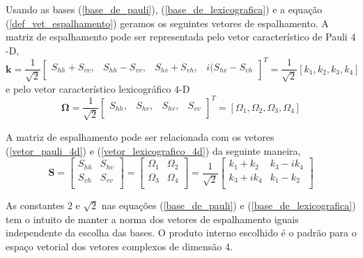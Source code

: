 Usando as bases (\ref{base_de_pauli}), (\ref{base_de_lexicografica}) e a equação (\ref{def_vet_espalhamento}) geramos os seguintes vetores de espalhamento. A matriz de espalhamento pode ser representada pelo vetor característico de Pauli $4$-D,
\begin{equation}\label{vetor_pauli_4d}
\mathbf{k}= \frac{1}{\sqrt{2}}\left[
	\begin{array}{cccc}
	S_{hh} + S_{vv},& S_{hh} - S_{vv},& S_{hv} + S_{vh}, &i (S_{hv} - S_{vh}   \\
\end{array}\right]^T=\frac{1}{\sqrt{2}}[k_1, k_2, k_3, k_4]
\end{equation}
e pelo vetor característico lexicográfico $4$-D 
\begin{equation}\label{vetor_lexicografico_4d}
\mathbf{\Omega}= \frac{1}{\sqrt{2}}\left[
	\begin{array}{cccc}
	S_{hh},& S_{hv}, &S_{hv},& S_{vv}   \\
\end{array}\right]^T=[\Omega_1, \Omega_2, \Omega_3, \Omega_4]
\end{equation}

A matriz de espalhamento pode ser relacionada com os vetores (\ref{vetor_pauli_4d}) e (\ref{vetor_lexicografico_4d}) da seguinte maneira,
\begin{equation}\label{mat_esp_rel_pauli_lex}
\mathbf{S} = \left[
\begin{array}{cc}
	S_{hh}   & S_{hv}   \\
	S_{vh}   & S_{vv}   \\
\end{array}
\right]=
\left[
\begin{array}{cc}
	\Omega_1   & \Omega_2   \\
	\Omega_3   & \Omega_4   \\
\end{array}
\right]=\frac{1}{\sqrt{2}}
\left[
\begin{array}{cc}
	 k_1+k_2  & k_3-ik_4   \\
	 k_3+ik_4 & k_1-k_2   \\
\end{array}
\right]
\end{equation}

As constantes $2$ e $\sqrt{2}$ nas equações (\ref{base_de_pauli}) e (\ref{base_de_lexicografica}) tem o intuito de manter a norma dos vetores de espalhamento iguais independente da escolha das bases. O produto interno escolhido é o padrão para o espaço vetorial dos vetores complexos de dimensão 4.

